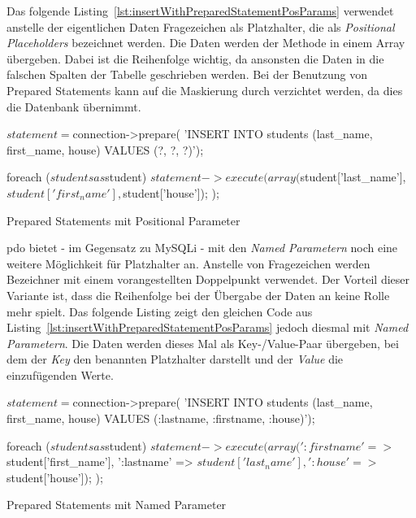 Das folgende Listing~\ref{lst:insertWithPreparedStatementPosParams} verwendet anstelle der eigentlichen Daten Fragezeichen als Platzhalter, die als \textit{Positional Placeholders} bezeichnet werden. Die Daten werden der Methode  in einem Array übergeben. Dabei ist die Reihenfolge wichtig, da ansonsten die Daten in die falschen Spalten der Tabelle geschrieben werden. Bei der Benutzung von Prepared Statements kann auf die Maskierung durch  verzichtet werden, da dies die Datenbank übernimmt.
\begin{listing}[H]
\begin{phpcode}
$statement = $connection->prepare(
  'INSERT INTO students (last_name, first_name, house)
    VALUES (?, ?, ?)');

foreach ($students as $student) {
	$statement->execute(
	  array(
	    $student['last_name'],
	    $student['first_name'],
	    $student['house']);
	);
}
\end{phpcode}
\caption{Prepared Statements mit Positional Parameter}
\label{lst:insertWithPreparedStatementPosParams}
\end{listing}

\newpage

\gls{pdo} bietet - im Gegensatz zu MySQLi - mit den \textit{Named Parametern} noch eine weitere Möglichkeit für Platzhalter an. Anstelle von Fragezeichen werden Bezeichner mit einem vorangestellten Doppelpunkt verwendet. Der Vorteil dieser Variante ist, dass die Reihenfolge bei der Übergabe der Daten an  keine Rolle mehr spielt. Das folgende Listing zeigt den gleichen Code aus Listing~\ref{lst:insertWithPreparedStatementPosParams} jedoch diesmal mit \textit{Named Parametern}. Die Daten werden dieses Mal als Key-/Value-Paar übergeben, bei dem der \textit{Key} den benannten Platzhalter darstellt und der \textit{Value} die einzufügenden Werte.

\begin{listing}[H]
\begin{phpcode}
$statement = $connection->prepare(
  'INSERT INTO students (last_name, first_name, house)
    VALUES (:lastname, :firstname, :house)');

foreach ($students as $student) {
	$statement->execute(
	  array(
	    ':firstname' => $student['first_name'],
	    ':lastname'  => $student['last_name'],
	    ':house'     => $student['house']);
	);
}
\end{phpcode}
\caption{Prepared Statements mit Named Parameter}
\label{lst:insertWithPreparedStatementNamedParams}
\end{listing}

